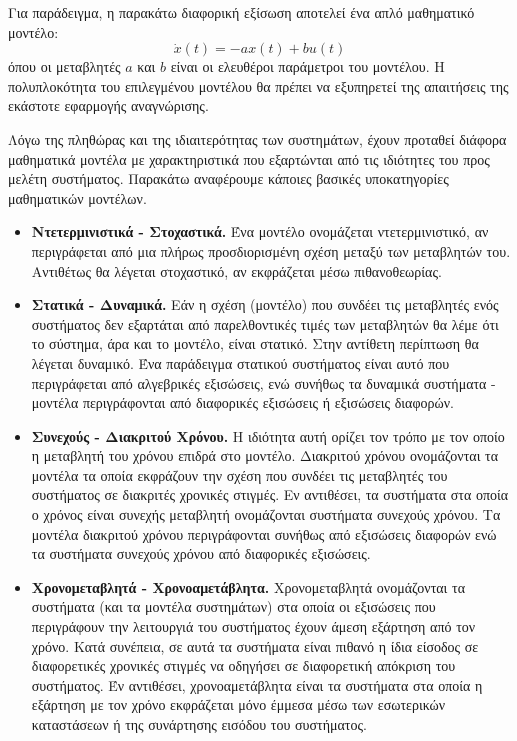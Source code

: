 Για παράδειγμα, η παρακάτω διαφορική εξίσωση αποτελεί ένα απλό μαθηματικό μοντέλο:
\begin{equation*}
	\dot{x}(t) = -a x(t) + b u(t)
\end{equation*}
όπου οι μεταβλητές $a$ και $b$ είναι οι ελευθέροι παράμετροι του μοντέλου. Η πολυπλοκότητα του επιλεγμένου μοντέλου θα πρέπει να εξυπηρετεί της απαιτήσεις της εκάστοτε εφαρμογής αναγνώρισης.

Λόγω της πληθώρας και της ιδιαιτερότητας των συστημάτων, έχουν προταθεί διάφορα μαθηματικά μοντέλα με χαρακτηριστικά που εξαρτώνται από τις ιδιότητες του προς μελέτη συστήματος. Παρακάτω αναφέρουμε κάποιες βασικές υποκατηγορίες μαθηματικών μοντέλων.

\begin{itemize}
	\item{ 
	\textbf{Ντετερμινιστικά - Στοχαστικά.} Ένα μοντέλο ονομάζεται ντετερμινιστικό, αν περιγράφεται από μια πλήρως προσδιορισμένη σχέση μεταξύ των μεταβλητών του. Αντιθέτως θα λέγεται στοχαστικό, αν εκφράζεται μέσω πιθανοθεωρίας.
	}
	
	\item{ 
	\textbf{Στατικά - Δυναμικά.} Εάν η σχέση (μοντέλο) που συνδέει τις μεταβλητές ενός συστήματος δεν εξαρτάται από παρελθοντικές τιμές των μεταβλητών θα λέμε ότι το σύστημα, άρα και το μοντέλο, είναι στατικό. Στην αντίθετη περίπτωση θα λέγεται δυναμικό. Ένα παράδειγμα στατικού συστήματος είναι αυτό που περιγράφεται από αλγεβρικές εξισώσεις, ενώ συνήθως τα δυναμικά συστήματα - μοντέλα περιγράφονται από διαφορικές εξισώσεις ή εξισώσεις διαφορών.
	}
	
	\item{ 
	\textbf{Συνεχούς - Διακριτού Χρόνου.} Η ιδιότητα αυτή ορίζει τον τρόπο με τον οποίο η μεταβλητή του χρόνου επιδρά στο μοντέλο. Διακριτού χρόνου ονομάζονται τα μοντέλα τα οποία εκφράζουν την σχέση που συνδέει τις μεταβλητές του συστήματος σε διακριτές χρονικές στιγμές. Eν αντιθέσει, τα συστήματα στα οποία ο χρόνος είναι συνεχής μεταβλητή ονομάζονται συστήματα συνεχούς χρόνου. Τα μοντέλα διακριτού χρόνου περιγράφονται συνήθως από εξισώσεις διαφορών ενώ τα συστήματα συνεχούς χρόνου από διαφορικές εξισώσεις.
	}
	
	\item{ 
	\textbf{Χρονομεταβλητά - Χρονοαμετάβλητα.} Χρονομεταβλητά ονομάζονται τα συστήματα (και τα μοντέλα συστημάτων) στα οποία οι εξισώσεις που περιγράφουν την λειτουργιά του συστήματος έχουν άμεση εξάρτηση από τον χρόνο. Κατά συνέπεια, σε αυτά τα συστήματα είναι πιθανό η ίδια είσοδος σε διαφορετικές χρονικές στιγμές να οδηγήσει σε διαφορετική απόκριση του συστήματος. Έν αντιθέσει, χρονοαμετάβλητα είναι τα συστήματα στα οποία η εξάρτηση με τον χρόνο εκφράζεται μόνο έμμεσα μέσω των εσωτερικών καταστάσεων ή της συνάρτησης εισόδου του συστήματος. 
	
}
\end{itemize}
